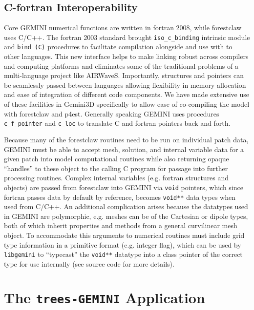 \documentclass[11pt,letterpaper]{article}
\begin{document}
\subsection{C-fortran Interoperability}

Core GEMINI numerical functions are written in fortran 2008, while forestclaw uses C/C++.  The fortran 2003 standard brought \texttt{iso\_c\_binding} intrinsic module and \texttt{bind (C)} procedures to facilitate compilation alongside and use with to other languages.  This new interface helps to make linking robust across compilers and computing platforms and eliminates some of the traditional problems of a multi-language project like AIRWaveS.  Importantly, structures and pointers can be seamlessly passed between languages allowing flexibility in memory allocation and ease of integration of different code components.  We have made extensive use of these facilities in Gemini3D specifically to allow ease of co-compiling the model with forestclaw and p4est.  Generally speaking GEMINI uses procedures \texttt{c\_f\_pointer} and \texttt{c\_loc} to translate C and fortran pointers back and forth.  

Because many of the forestclaw routines need to be run on individual patch data, GEMINI must be able to accept mesh, solution, and internal variable data for a given patch into model computational routines while also returning opaque ``handles'' to these object to the calling C program for passage into further processing routines.  Complex internal variables (e.g. fortran structures and objects) are passed from forestclaw into GEMINI via \texttt{void} pointers, which since fortran passes data by default by reference, becomes \texttt{void**} data types when used from C/C++.  An additional complication arises because the datatypes used in GEMINI are polymorphic, e.g. meshes can be of the Cartesian or dipole types, both of which inherit properties and methods from a general curvilinear mesh object.  To accommodate this arguments to numerical routines must include grid type information in a primitive format (e.g. integer flag), which can be used by \texttt{libgemini} to ``typecast'' the \texttt{void**} datatype into a class pointer of the correct type for use internally (see source code for more details).  


\section{The \texttt{trees-GEMINI} Application} \label{sec:tG}
\end{document}
